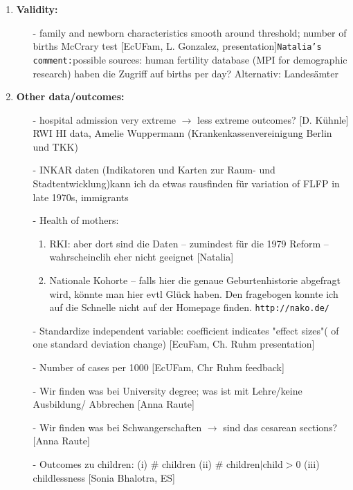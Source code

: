 \documentclass[11pt,a4paper]{article}
\begin{document}
{\begin{enumerate}
\item \textbf{Validity:}\vspace{-1em}
\begin{itemize}
	\item[-] family and newborn characteristics smooth around threshold; number of births McCrary test [EcUFam, L. Gonzalez, presentation]\newline \texttt{Natalia's comment:}possible sources: human fertility database (MPI for demographic research) haben die Zugriff auf births per day? Alternativ: Landesämter
\end{itemize}


\item \textbf{Other data/outcomes:}\vspace{-1 em}
\begin{itemize}
	\item[-] hospital admission very extreme $\rightarrow$ less extreme outcomes? [D. Kühnle] RWI HI data, Amelie Wuppermann (Krankenkassenvereinigung Berlin und TKK)
	\item[-] INKAR daten (Indikatoren und Karten zur Raum- und Stadtentwicklung)\newline kann ich da etwas rausfinden für variation of FLFP in late 1970s, immigrants 
	\item[-] Health of mothers: \vspace{-.5em}
	\begin{enumerate}
		\item RKI: aber dort sind die Daten – zumindest für die 1979 Reform – wahrscheinclih eher nicht geeignet [Natalia]
		\item  Nationale Kohorte – falls hier die genaue Geburtenhistorie abgefragt wird, könnte man hier evtl Glück haben. Den fragebogen konnte ich auf die Schnelle nicht auf der Homepage finden. \texttt{http://nako.de/}
	\end{enumerate}
	\item[-] Standardize independent variable: coefficient indicates "effect sizes"( of one standard deviation change) [EcuFam, Ch. Ruhm presentation]
	\item[-] Number of cases  per 1000 [EcUFam, Chr Ruhm feedback] 
	\item[-] Wir finden was bei University degree; was ist mit Lehre/keine Ausbildung/ Abbrechen [Anna Raute]
	\item[-] Wir finden was bei Schwangerschaften $\rightarrow$ sind das cesarean sections? [Anna Raute]
	\item[-] Outcomes zu children: (i) \#  children (ii) \# children$|$child$>$0 (iii) childlessness [Sonia Bhalotra, ES]
\end{itemize}



\end{enumerate}}
\end{document}
